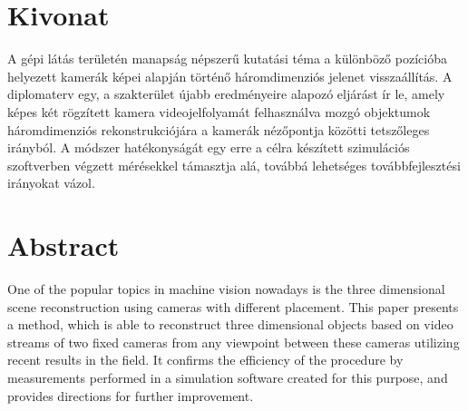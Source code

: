 
\hungarianParagraph

\chapter*{Kivonat}


A gépi látás területén manapság népszerű kutatási téma a különböző pozícióba helyezett kamerák képei alapján történő háromdimenziós jelenet visszaállítás. A diplomaterv egy, a szakterület újabb eredményeire alapozó eljárást ír le, amely képes két rögzített kamera videojelfolyamát felhasználva mozgó objektumok háromdimenziós rekonstrukciójára a kamerák nézőpontja közötti tetszőleges irányból. A módszer hatékonyságát egy erre a célra készített szimulációs szoftverben végzett mérésekkel támasztja alá, továbbá lehetséges továbbfejlesztési irányokat vázol.

\vfill


\englishParagraph

\chapter*{Abstract}

One of the popular topics in machine vision nowadays is the three dimensional scene reconstruction using cameras with different placement. This paper presents a method, which is able to reconstruct three dimensional objects based on video streams of two fixed cameras from any viewpoint between these cameras utilizing recent results in the field. It confirms the efficiency of the procedure by measurements performed in a simulation software created for this purpose, and provides directions for further improvement.

\vfill

\dolgozatnyelve
